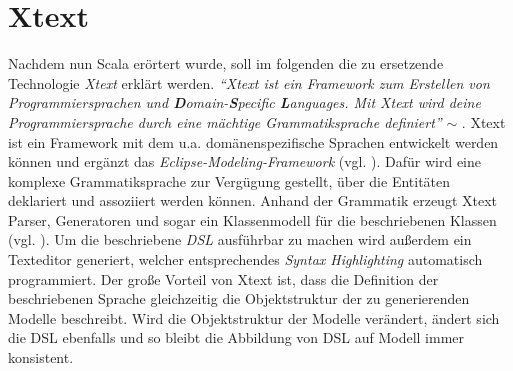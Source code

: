 \section{Xtext}\label{xtext}
Nachdem nun Scala erörtert wurde, soll im folgenden die zu ersetzende Technologie \textit{Xtext} erklärt werden.
\textit{"`Xtext ist ein Framework zum Erstellen von Programmiersprachen und \textbf{D}omain-\textbf{S}pecific \textbf{L}anguages. Mit Xtext wird deine Programmiersprache durch eine mächtige Grammatiksprache definiert"'} $\sim$ .
Xtext ist ein Framework mit dem u.a. domänenspezifische Sprachen entwickelt werden können und ergänzt das \textit{Eclipse-Modeling-Framework} (vgl. \citet{emf}). Dafür wird eine komplexe Grammatiksprache zur Vergügung gestellt, über die Entitäten deklariert und assoziiert werden können. Anhand der Grammatik erzeugt Xtext Parser, Generatoren und sogar ein Klassenmodell für die beschriebenen Klassen (vgl. \citet{xtext:goodbyexml}). Um die beschriebene \textit{DSL} ausführbar zu machen wird außerdem ein Texteditor generiert, welcher entsprechendes \textit{Syntax Highlighting} automatisch programmiert. Der große Vorteil von Xtext ist, dass die Definition der beschriebenen Sprache gleichzeitig die Objektstruktur der zu generierenden Modelle beschreibt. Wird die Objektstruktur der Modelle verändert, ändert sich die DSL ebenfalls und so bleibt die Abbildung von DSL auf Modell immer konsistent. 
